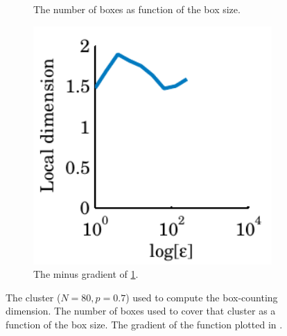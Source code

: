 \begin{figure}
\begin{subfigure}[t]{0.3\textwidth}
		\caption{The number of boxes as function of the box size.}
		\label{fig:exp_fractal:fractalDimension}	
	\end{subfigure}	
	\begin{subfigure}[t]{0.3\textwidth}
		\centering
		\includegraphics[width=1\textwidth]{./img/assignment_fractal_gradient}
		\caption{The minus gradient of \cref{fig:exp_fractal:fractalDimension}.}
		\label{fig:exp_fractal:fractalDimensionGradient}
	\end{subfigure}		
	\caption{ The cluster ($N = 80, p = 0.7$) used to compute the box-counting dimension.  The number of boxes used to cover that cluster as a function of the box size.  The gradient of the function plotted in .}
	\label{fig:exp:dimension:plaatjes}
\end{figure}

